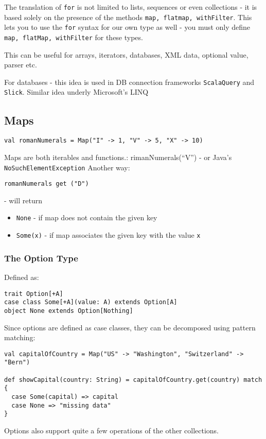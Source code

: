 \documentclass{scrartcl}
\begin{document}
The translation of \lstinline|for| is not limited to lists, sequences or even
collections - it is based solely on the presence of the methods
 \lstinline|map, flatmap, withFilter|. This lets you to use the \lstinline|for|
 syntax for our own type as well - you must only define
 \lstinline|map, flatMap, withFilter| for these types.

This can be useful for arrays, iterators, databases, XML data, optional value,
parser etc.

For databases - this idea is used in DB connection frameworks
\lstinline|ScalaQuery| and \lstinline|Slick|. Similar idea underly Microsoft's LINQ

\subsection{Maps}
\label{sec:Maps}
\begin{lstlisting}
val romanNumerals = Map("I" -> 1, "V" -> 5, "X" -> 10)
\end{lstlisting}
Maps are both iterables and functions.: rimanNumerals(``V'') - or Java's
\lstinline|NoSuchElementException| Another way:
\begin{lstlisting}
romanNumerals get ("D")
\end{lstlisting}
- will return
\begin{itemize}
\item \lstinline|None| - if map does not contain the given key
\item \lstinline|Some(x)| - if map associates the given key with the value
  \lstinline|x|
\end{itemize}

\subsubsection{The Option Type}
\label{sec:OptionType}
Defined as:
\begin{lstlisting}
trait Option[+A]
case class Some[+A](value: A) extends Option[A]
object None extends Option[Nothing]
\end{lstlisting}

Since options are defined as case classes, they can be decomposed using pattern
matching: 
\begin{lstlisting}
val capitalOfCountry = Map("US" -> "Washington", "Switzerland" -> "Bern")

def showCapital(country: String) = capitalOfCountry.get(country) match {
  case Some(capital) => capital
  case None => "missing data"
}
\end{lstlisting}
Options also support quite a few operations of the other collections.
\end{document}
